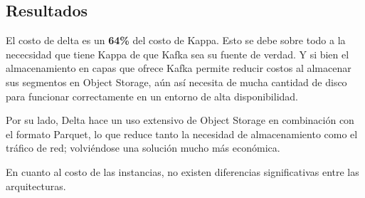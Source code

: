 \newpage

\subsection{Resultados}

El costo de delta es un \textbf{64\%} del costo de Kappa. 
Esto se debe sobre todo a la nececsidad que tiene Kappa de que Kafka sea su fuente de verdad.
Y si bien el almacenamiento en capas que ofrece Kafka permite reducir costos al almacenar sus segmentos en Object Storage,
aún así necesita de mucha cantidad de disco para funcionar correctamente en un entorno de alta disponibilidad.

Por su lado, Delta hace un uso extensivo de Object Storage en combinación con el formato Parquet, lo que reduce 
tanto la necesidad de almacenamiento como el tráfico de red; volviéndose una solución mucho más económica.

En cuanto al costo de las instancias, no existen diferencias significativas entre las arquitecturas. 
\newpage